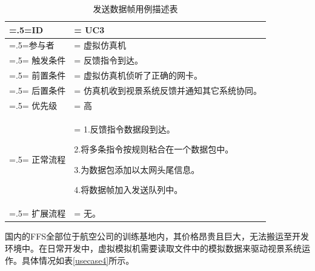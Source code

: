 \begin{table}[htbp]
    \begin{center}
        \caption{发送数据帧用例描述表}
        \label{usecase3}
        \renewcommand\arraystretch{1.5}
        \begin{tabularx}{0.8\textwidth}{ 
            | >{\centering\arraybackslash\hsize=.5\hsize\linewidth=\hsize}X 
            | >{\raggedright\arraybackslash\hsize=1.5\hsize\linewidth=\hsize}X 
            | }
            \hline
            \textbf{ID} & \textbf{UC3}\\
            \hline
            参与者 & 虚拟仿真机\\
            \hline
            触发条件 & 反馈指令到达。\\
            \hline
            前置条件 & 虚拟仿真机侦听了正确的网卡。\\
            \hline
            后置条件 & 仿真机收到视景系统反馈并通知其它系统协同。\\
            \hline
            优先级 & 高\\
            \hline
            正常流程 & 1.反馈指令数据段到达。\par 2.将多条指令按规则粘合在一个数据包中。\par 3.为数据包添加以太网头尾信息。\par 4.将数据帧加入发送队列中。\\
            \hline
            扩展流程 & 无。\\
            \hline
        \end{tabularx}
    \end{center}
\end{table}
\par
国内的FFS全部位于航空公司的训练基地内，其价格昂贵且巨大，无法搬运至开发环境中。在日常开发中，虚拟模拟机需要读取文件中的模拟数据来驱动视景系统运作。具体情况如表\ref{usecase4}所示。
